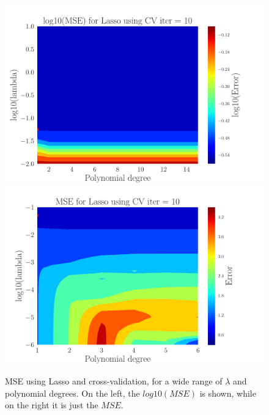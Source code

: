 \documentclass[reprint,english,notitlepage,aps,nobalancelastpage,nofootinbib]{revtex4-1}  %
\begin{document}
\begin{figure}[h]
	\includegraphics[width=\linewidth]{Contour_PL_Lasso_CV10_n30_eps0.2_p1_15_lmb1_m2.pdf}
	\endminipage\hfill
	\includegraphics[width=\linewidth]{Contour_PL_Lasso_CV10_n30_eps0.2_p1_6_lmbm1_m6.pdf}
	\endminipage
	\caption{MSE using Lasso and cross-validation, for a wide range of $\lambda$ and polynomial degrees. On the left, the $log10(MSE)$ is shown, while on the right it is just the $MSE$.}
	\label{fig:Lasso_CV_heatmaps}
\end{figure}
\end{document}
